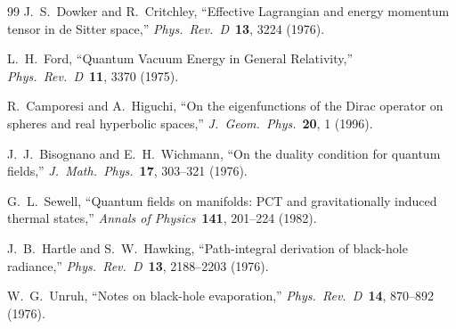 \documentclass[11pt]{article}
\begin{document}
\begin{thebibliography}{99}
J.~S.~Dowker and R.~Critchley, ``Effective Lagrangian and energy
momentum tensor in de Sitter space,''
\textit{Phys.\ Rev.\ D}\ \textbf{13}, 3224 (1976).

L.~H.~Ford, ``Quantum Vacuum Energy in General Relativity,''
\textit{Phys.\ Rev.\ D}\ \textbf{11}, 3370 (1975).

R.~Camporesi and A.~Higuchi, ``On the eigenfunctions of the Dirac
operator on spheres and real hyperbolic spaces,''
\textit{J.\ Geom.\ Phys.}\ \textbf{20}, 1 (1996).

J.~J.~Bisognano and E.~H.~Wichmann,
``On the duality condition for quantum fields,''
\textit{J.\ Math.\ Phys.}\ \textbf{17}, 303--321 (1976).

G.~L.~Sewell,
``Quantum fields on manifolds: PCT and gravitationally induced thermal
states,''
\textit{Annals of Physics}\ \textbf{141}, 201--224 (1982).

J.~B.~Hartle and S.~W.~Hawking,
``Path-integral derivation of black-hole radiance,''
\textit{Phys.\ Rev.\ D}\ \textbf{13}, 2188--2203 (1976).

W.~G.~Unruh,
``Notes on black-hole evaporation,''
\textit{Phys.\ Rev.\ D}\ \textbf{14}, 870--892 (1976).

\end{thebibliography}
\end{document}
